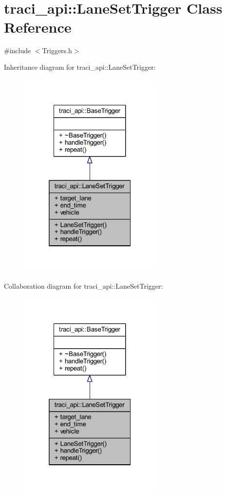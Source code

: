 \hypertarget{classtraci__api_1_1_lane_set_trigger}{}\section{traci\+\_\+api\+:\+:Lane\+Set\+Trigger Class Reference}
\label{classtraci__api_1_1_lane_set_trigger}


{\ttfamily \#include $<$Triggers.\+h$>$}



Inheritance diagram for traci\+\_\+api\+:\+:Lane\+Set\+Trigger\+:
\nopagebreak
\begin{figure}[H]
\begin{center}
\leavevmode
\includegraphics[width=205pt]{classtraci__api_1_1_lane_set_trigger__inherit__graph}
\end{center}
\end{figure}


Collaboration diagram for traci\+\_\+api\+:\+:Lane\+Set\+Trigger\+:
\nopagebreak
\begin{figure}[H]
\begin{center}
\leavevmode
\includegraphics[width=205pt]{classtraci__api_1_1_lane_set_trigger__coll__graph}
\end{center}
\end{figure}
